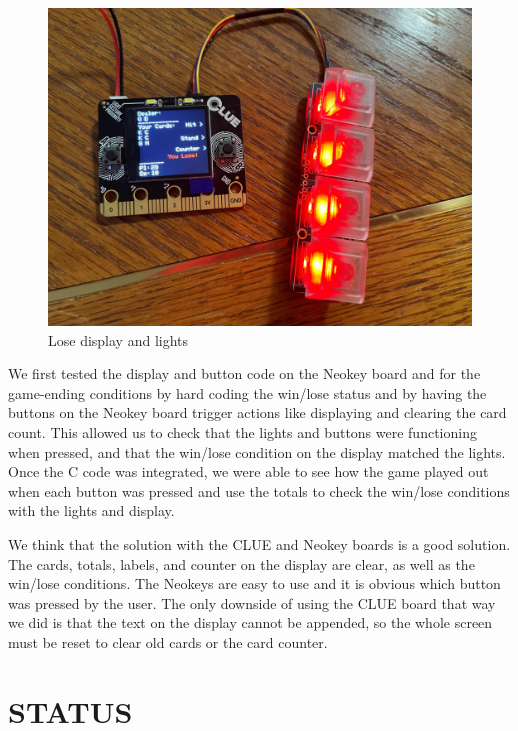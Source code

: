 \documentclass[12pt]{article}
\begin{document}
\begin{figure}[ht]
  \centering
  \includegraphics[width=6in]{lose.jpg}
  \caption{Lose display and lights}
  \label{fig:lose}
  \end{figure}

We first tested the display and button code on the Neokey board and for the game-ending conditions by hard coding the win/lose status and by having the buttons on the Neokey board trigger actions like displaying and clearing the card count. This allowed us to check that the lights and buttons were functioning when pressed, and that the win/lose condition on the display matched the lights. Once the C code was integrated, we were able to see how the game played out when each button was pressed and use the totals to check the win/lose conditions with the lights and display. 

We think that the solution with the CLUE and Neokey boards is a good solution. The cards, totals, labels, and counter on the display are clear, as well as the win/lose conditions. The Neokeys are easy to use and it is obvious which button was pressed by the user. The only downside of using the CLUE board that way we did is that the text on the display cannot be appended, so the whole screen must be reset to clear old cards or the card counter.

\section{STATUS}
\end{document}
